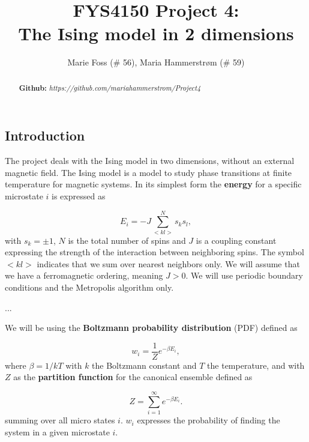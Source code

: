 \documentclass{article}
\title{\textbf{FYS4150 Project 4: \\The Ising model in 2 dimensions}}
\author{Marie Foss (\# 56), Maria Hammerstr{{\o}}m (\# 59)}
\date{} %
\begin{document}
\maketitle

\begin{abstract}
	\noindent \lipsum[1]
	\vspace*{2ex}
	
	\noindent \textbf{Github:} \textit{https://github.com/mariahammerstrom/Project4}
	\vspace*{2ex}
\end{abstract}



\begin{multicols}{2}

\section{Introduction}

The project deals with the Ising model in two dimensions, without an external magnetic field. The Ising model is a model to study phase transitions at finite temperature for magnetic systems. In its simplest form the \textbf{energy} for a specific microstate $i$ is expressed as

\begin{equation}\label{eq:energy}
	E_i = -J \sum_{<kl>}^{N}s_k s_l,
\end{equation}
with  $s_k=\pm 1$, $N$ is the total number of spins and $J$ is a coupling constant expressing the strength of the interaction between neighboring spins. The symbol $<kl>$ indicates that we sum over nearest neighbors only. We will assume that we have a ferromagnetic ordering, meaning $J> 0$. We will use periodic boundary conditions and the Metropolis algorithm only. 

...

We will be using the \textbf{Boltzmann probability distribution} (PDF) defined as

\begin{equation}\label{eq:distribution}
	w_i = \frac{1}{Z} e^{- \beta E_i},
\end{equation}
where $\beta = 1/kT$ with $k$ the Boltzmann constant and $T$ the temperature, and with $Z$ as the \textbf{partition function} for the canonical ensemble defined as

\begin{equation}\label{eq:partition_func}
	Z = \sum_{i = 1}^{\infty} e^{-\beta E_i}.
\end{equation}
summing over all micro states $i$. $w_i$ expresses the probability of finding the system in a given microstate $i$.


\end{multicols}
\end{document}
